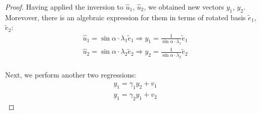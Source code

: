 \begin{proof}

Having applied the inversion to $\hat{u}_1$, $\hat{u}_2$, we obtained
new vectors $y_1$, $y_2$. Morevover, there is an algebraic expression for them
in terms of rotated basis $\tilde{e}_1$, $\tilde{e}_2$:
\begin{align*}
&\hat{u}_1 = \sin \alpha \cdot \lambda_1 \tilde{e}_1 \Rightarrow y_1 = \frac{1}{\sin \alpha \cdot \lambda_1} \tilde{e}_1 \\
&\hat{u}_2 = \sin \alpha \cdot \lambda_2 \tilde{e}_2 \Rightarrow y_2 = \frac{1}{\sin \alpha \cdot \lambda_2} \tilde{e}_2 \\
\end{align*}

Next, we perform another two regressions:
\begin{align*}
& y_1 = \gamma_1 y_2 + v_1 \\
& y_1 = \gamma_2 y_1 + v_2
\end{align*}


\end{proof}
